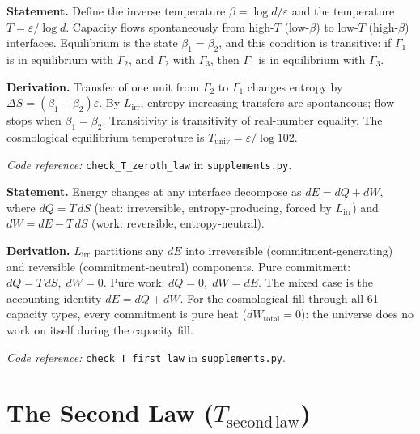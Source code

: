 \documentclass[11pt]{article}
\newcommand{\coderef}[2]{\smallskip\noindent\textit{Code reference:} \texttt{#1} in \texttt{#2}.}
\newcommand{\epitag}[1]{\textbf{[#1]}}
\begin{document}
\begin{tcolorbox}[apfbox, title={Theorem $T_{\mathrm{zeroth}}$ (Zeroth Law) \epitag{P}}]
\textbf{Statement.}  Define the inverse temperature $\beta = \log d / \varepsilon$
and the temperature $T = \varepsilon / \log d$.  Capacity flows spontaneously
from high-$T$ (low-$\beta$) to low-$T$ (high-$\beta$) interfaces.
Equilibrium is the state $\beta_1 = \beta_2$, and this condition is
transitive: if $\Gamma_1$ is in equilibrium with $\Gamma_2$, and $\Gamma_2$
with $\Gamma_3$, then $\Gamma_1$ is in equilibrium with $\Gamma_3$.

\textbf{Derivation.}  Transfer of one unit from $\Gamma_2$ to $\Gamma_1$
changes entropy by $\Delta S = (\beta_1 - \beta_2)\varepsilon$.  By
$L_{\mathrm{irr}}$, entropy-increasing transfers are spontaneous; flow stops
when $\beta_1 = \beta_2$.  Transitivity is transitivity of real-number equality.
The cosmological equilibrium temperature is $T_{\mathrm{univ}} = \varepsilon/\log 102$.

\coderef{check\_T\_zeroth\_law}{supplements.py}
\end{tcolorbox}

\begin{tcolorbox}[apfbox, title={Theorem $T_{\mathrm{first}}$ (First Law) \epitag{P}}]
\textbf{Statement.}  Energy changes at any interface decompose as
$dE = dQ + dW$, where $dQ = T\,dS$ (heat: irreversible, entropy-producing,
forced by $L_{\mathrm{irr}}$) and $dW = dE - T\,dS$ (work: reversible,
entropy-neutral).

\textbf{Derivation.}  $L_{\mathrm{irr}}$ partitions any $dE$ into
irreversible (commitment-generating) and reversible (commitment-neutral)
components.  Pure commitment: $dQ = T\,dS,\; dW = 0$.  Pure work: $dQ = 0,\;
dW = dE$.  The mixed case is the accounting identity $dE = dQ + dW$.
For the cosmological fill through all 61 capacity types, every commitment is
pure heat ($dW_{\mathrm{total}} = 0$): the universe does no work on itself
during the capacity fill.

\coderef{check\_T\_first\_law}{supplements.py}
\end{tcolorbox}


\section{The Second Law ($T_{\mathrm{second\,law}}$)}
\label{sec:secondlaw}
\end{document}
